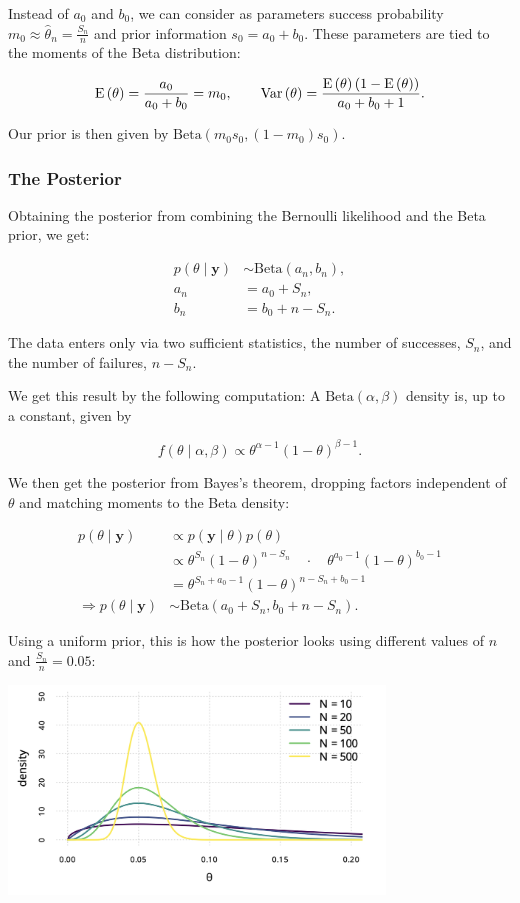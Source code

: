 Instead of $a_0$ and $b_0$, we can consider as parameters success probability $m_0 \approx \hat\theta_n = \frac{S_n}{n}$ and prior information $s_0 = a_0 + b_0$. These parameters are tied to the moments of the Beta distribution:

\[
	\mathrm{E}\left({\theta}\right) = \frac{a_0}{a_0+b_0} = m_0, \qquad \mathrm{Var}\left({\theta}\right) = \frac{\mathrm{E}\left({\theta}\right)(1-\mathrm{E}\left({\theta}\right))}{a_0 + b_0 + 1}.
\]

Our prior is then given by $\mathrm{Beta}(m_0s_0,(1-m_0)s_0)$.

\subsubsection{The Posterior}

Obtaining the posterior from combining the Bernoulli likelihood and the Beta prior, we get:

\begin{align*}
	p(\theta\mid\bm{y}) &\sim \mathrm{Beta}(a_n,b_n), \\
	a_n &= a_0 + S_n, \\
	b_n &= b_0 + n - S_n.
\end{align*}

The data enters only via two sufficient statistics, the number of successes, $S_n$, and the number of failures, $n-S_n$. 

We get this result by the following computation: A $\mathrm{Beta}(\alpha,\beta)$ density is, up to a constant, given by

\[
	f(\theta \mid \alpha,\beta) \propto \theta^{\alpha-1}(1-\theta)^{\beta-1}.
\]

We then get the posterior from Bayes's theorem, dropping factors independent of $\theta$ and matching moments to the Beta density:

\begin{align*}
	p(\theta\mid\bm{y}) &\propto p(\bm{y}\mid\theta)p(\theta) \\
	& \propto \theta^{S_n}(1-\theta)^{n-S_n} \quad \cdot \quad \theta^{a_0-1}(1-\theta)^{b_0 -1} \\
	& = \theta^{S_n+a_0-1}(1-\theta)^{n-S_n+b_0-1} \\
	\Rightarrow p(\theta\mid\bm{y}) &\sim \mathrm{Beta}(a_0+S_n,b_0+n-S_n).
\end{align*}

Using a uniform prior, this is how the posterior looks using different values of $n$ and $\frac{S_n}{n} = 0.05$:

\begin{center}
	\includegraphics[width = 10cm]{betapost.png}
\end{center}

